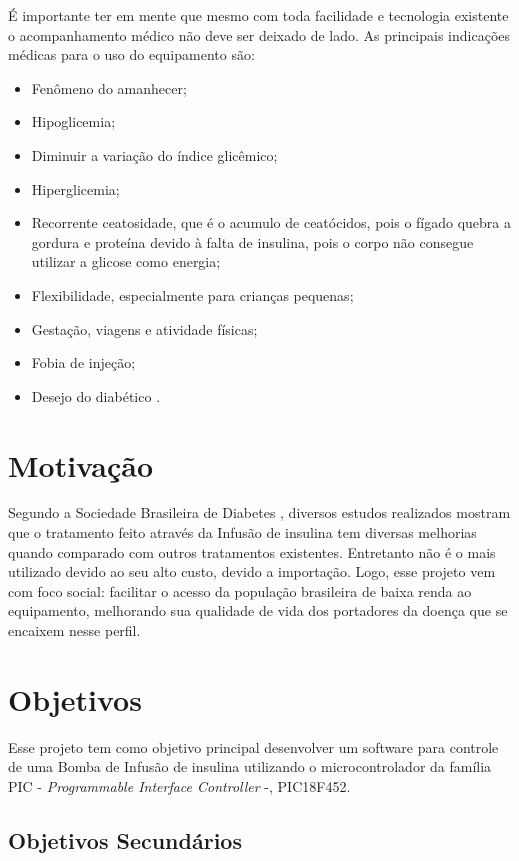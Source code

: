 É importante ter em mente que mesmo com toda facilidade e tecnologia existente o acompanhamento médico não deve ser deixado de lado. As principais indicações médicas para o uso do equipamento são:

\begin{itemize}
\item Fenômeno do amanhecer;
\item Hipoglicemia;
\item Diminuir a variação do índice glicêmico;
\item Hiperglicemia;
\item Recorrente ceatosidade, que é o acumulo de ceatócidos, pois o fígado quebra a gordura e proteína devido à falta de insulina, pois o corpo não consegue utilizar a glicose como energia;
\item Flexibilidade, especialmente para crianças pequenas;
\item Gestação, viagens e atividade físicas;
\item Fobia de injeção;
\item Desejo do diabético \cite{sbc2014, diabetes2013, portaldiabetes2009}.
\end{itemize}

\section{Motivação}
Segundo a Sociedade Brasileira de Diabetes \cite{sbc2014}, diversos estudos realizados mostram que o tratamento feito através da Infusão de insulina tem diversas melhorias quando comparado com outros tratamentos existentes. Entretanto não é o mais utilizado devido ao seu alto custo, devido a importação.
Logo, esse projeto vem com foco social: facilitar o acesso da população brasileira de baixa renda ao equipamento, melhorando sua qualidade de vida dos portadores da doença que se encaixem nesse perfil. 

\section{Objetivos}
Esse projeto tem como objetivo principal desenvolver um software para controle de uma Bomba de Infusão de insulina utilizando o microcontrolador da família PIC - \emph{Programmable Interface Controller} -, PIC18F452. 

\subsection{Objetivos Secundários}

